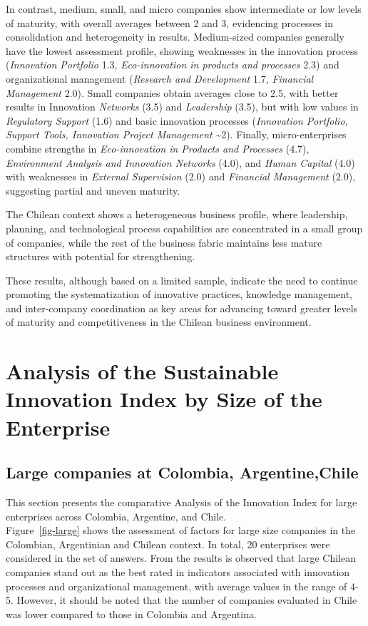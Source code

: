 \documentclass[
  12pt,
  oneside]{book}
\begin{document}
In contrast, medium, small, and micro companies show intermediate or low
levels of maturity, with overall averages between 2 and 3, evidencing
processes in consolidation and heterogeneity in results. Medium-sized
companies generally have the lowest assessment profile, showing
weaknesses in the innovation process (\emph{Innovation Portfolio} 1.3,
\emph{Eco-innovation in products and processes} 2.3) and organizational
management (\emph{Research and Development} 1.7, \emph{Financial
Management} 2.0). Small companies obtain averages close to 2.5, with
better results in Innovation \emph{Networks} (3.5) and \emph{Leadership}
(3.5), but with low values in \emph{Regulatory Support} (1.6) and basic
innovation processes (\emph{Innovation Portfolio, Support Tools,
Innovation Project Management} \textasciitilde2). Finally,
micro-enterprises combine strengths in \emph{Eco-innovation in Products
and Processes }(4.7), \emph{Environment Analysis and Innovation Networks
}(4.0), and \emph{Human Capital} (4.0) with weaknesses in \emph{External
Supervision} (2.0) and \emph{Financial Management} (2.0), suggesting
partial and uneven maturity.

The Chilean context shows a heterogeneous business profile, where
leadership, planning, and technological process capabilities are
concentrated in a small group of companies, while the rest of the
business fabric maintains less mature structures with potential for
strengthening.

These results, although based on a limited sample, indicate the need to
continue promoting the systematization of innovative practices,
knowledge management, and inter-company coordination as key areas for
advancing toward greater levels of maturity and competitiveness in the
Chilean business environment.

\section{Analysis of the Sustainable Innovation Index by Size of the
Enterprise}\label{analysis-of-the-sustainable-innovation-index-by-size-of-the-enterprise}

\subsection{Large companies at Colombia,
Argentine,Chile}\label{large-companies-at-colombia-argentinechile}

This section presents the comparative Analysis of the Innovation Index
for large enterprises across Colombia, Argentine, and Chile.\\
Figure~\ref{fig-large} shows the assessment of factors for large size
companies in the Colombian, Argentinian and Chilean context. In total,
20 enterprises were considered in the set of answers. From the results
is observed that large Chilean companies stand out as the best rated in
indicators associated with innovation processes and organizational
management, with average values in the range of 4-5. However, it should
be noted that the number of companies evaluated in Chile was lower
compared to those in Colombia and Argentina.
\end{document}
